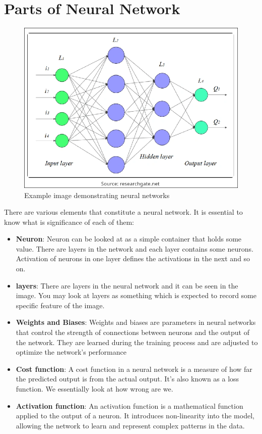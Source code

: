\documentclass[twoside]{article}
\begin{document}
\section{Parts of Neural Network}
\begin{figure}
    \centering
    \includegraphics[scale=0.3]{image.png}
    \caption{Example image demonstrating neural networks}
    \label{fig:enter-label}
\end{figure}


There are various elements that constitute a neural network. It is essential to know what is significance of each of them:

\begin{itemize}
    \item \textbf{Neuron}: Neuron can be looked at as a simple container that holds some value. There are layers in the network and each layer contains some neurons. Activation of neurons in one layer defines the activations in the next and so on.
    \item \textbf{layers}: There are layers in the neural network and it can be seen in the image.
    You may look at layers as something which is expected to record some specific feature of the image. 
    \item \textbf{Weights and Biases}: Weights and biases are parameters in neural networks that control the strength of connections between neurons and the output of the network. They are learned during the training process and are adjusted to optimize the network's performance
    \item \textbf{Cost function}: A cost function in a neural network is a measure of how far the predicted output is from the actual output. It's also known as a loss function. We essentially look at how wrong are we.
    \item \textbf{Activation function}: An activation function is a mathematical function applied to the output of a neuron. It introduces non-linearity into the model, allowing the network to learn and represent complex patterns in the data. 
\end{itemize}
\end{document}
